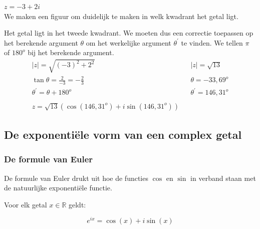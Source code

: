 \begin{voorbeeld}
	 $z=-3+2i$ \\ We maken een figuur om duidelijk te maken in welk kwadrant het getal ligt. \\


\begin{figure}[H]
	\centering 
	 
\end{figure}


	
	Het getal ligt in het tweede kwadrant. We moeten dus een correctie toepassen op het berekende argument $\theta$ om het werkelijke argument $\theta^{'}$ te vinden. We tellen  $\pi$ of $180^{o}$ bij het berekende argument. \\
	\[ \begin{array}{lll}
	|z|=\sqrt{(-3)^2 +2^2} & & |z|=\sqrt{13} \\
	\tan \theta = \frac{2}{-3}=-\frac{2}{3} & & \theta = -33,69^{o}\\
	\theta^{'}=\theta+180^{o} & & \theta^{'}=146,31^{o} \\
	&  &          \\
	z=\sqrt{13} (\cos (146,31^{o}) + i \sin (146,31^{o})) &  & 
	\end{array} \]

\end{voorbeeld}

\subsection{De exponenti\"{e}le vorm van een complex getal}

\subsubsection{De formule van Euler}

De formule van Euler drukt uit hoe de functies $\cos$ en $\sin$ in verband staan met de natuurlijke exponenti\"{e}le functie.\\
\begin{eigenschap}
	Voor elk getal $x \in \mathbb{R}$ geldt:\\

\begin{framed}
	\[ e^{ix}=\cos(x) + i \sin(x) \]
\end{framed}
\end{eigenschap}

